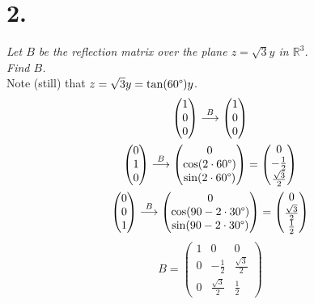 \documentclass[12pt]{article}
\begin{document}
\section*{2.}
\textit{Let $B$ be the reflection matrix over the plane
$z = \sqrt{3}y$ in $\mathbb{R}^3$. \\ Find $B$.}
\\[\baselineskip]
Note (still) that $z = \sqrt{3}y = \tan(60 \degree)y$.
\begin{gather*}
	\begin{pmatrix} 1 \\ 0 \\ 0 \end{pmatrix}
	\overset{B}{\longrightarrow}
	\begin{pmatrix} 1 \\ 0 \\ 0 \end{pmatrix}
	\\
	\begin{pmatrix} 0 \\ 1 \\ 0 \end{pmatrix}
	\overset{B}{\longrightarrow}
	\begin{pmatrix}
		0 \\
		\cos(2 \cdot 60 \degree) \\
		\sin(2 \cdot 60 \degree)
	\end{pmatrix}
	=
	\begin{pmatrix}
		0 \\
		-\frac{1}{2} \\
		\frac{\sqrt{3}}{2}
	\end{pmatrix}
	\\
	\begin{pmatrix} 0 \\ 0 \\ 1 \end{pmatrix}
	\overset{B}{\longrightarrow}
	\begin{pmatrix}
		0 \\
		\cos(90 - 2 \cdot 30 \degree) \\
		\sin(90 - 2 \cdot 30 \degree)
	\end{pmatrix}
	=
	\begin{pmatrix}
		0 \\
		\frac{\sqrt{3}}{2} \\
		\frac{1}{2}
	\end{pmatrix}
\end{gather*}
\begin{equation*}
	B =
	\boxed{
		\begin{pmatrix}
			1 & 0 & 0 \\
			0 & -\frac{1}{2} & \frac{\sqrt{3}}{2} \\
			0 & \frac{\sqrt{3}}{2} & \frac{1}{2}
		\end{pmatrix}
	}
\end{equation*}
\end{document}
